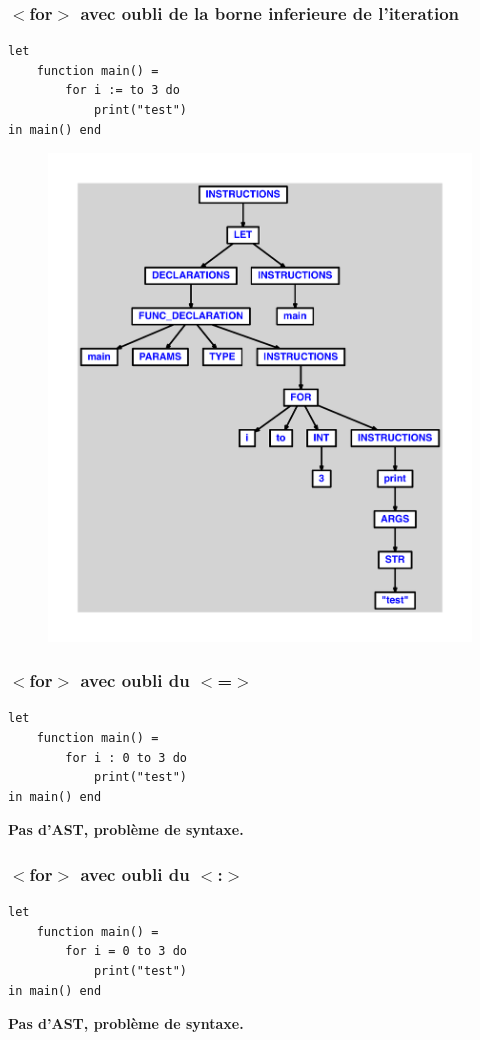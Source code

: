 \documentclass{article}
\begin{document}
\subsubsection{$ < $for$ > $ avec oubli de la borne inferieure de l'iteration}
\begin{lstlisting}
let
	function main() =
		for i := to 3 do
			print("test")
in main() end
\end{lstlisting}
\newpage
\begin{figure}[H]
\centering
\includegraphics[max width=\textwidth]{ast/ast_201.pdf}
\end{figure}
\newpage
\subsubsection{$ < $for$ > $ avec oubli du $ < $=$ > $}
\begin{lstlisting}
let
	function main() =
		for i : 0 to 3 do
			print("test")
in main() end
\end{lstlisting}
\newpage
{\color{red}\textbf{Pas d'AST, problème de syntaxe.}}
\newpage
\subsubsection{$ < $for$ > $ avec oubli du $ < $:$ > $}
\begin{lstlisting}
let
	function main() =
		for i = 0 to 3 do
			print("test")
in main() end
\end{lstlisting}
\newpage
{\color{red}\textbf{Pas d'AST, problème de syntaxe.}}
\newpage
\end{document}
